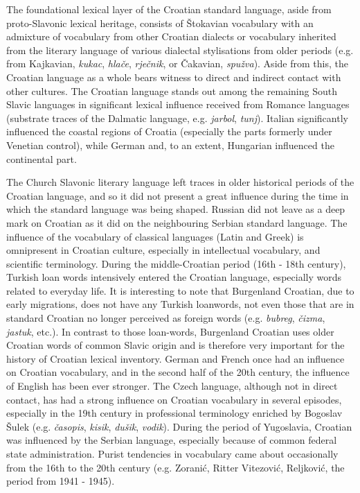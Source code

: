 \begin{multicols}{2}
The foundational lexical layer of the Croatian standard language, aside from proto-Slavonic lexical heritage, consists of Štokavian vocabulary with an admixture of vocabulary from other Croatian dialects or vocabulary inherited from the literary language of various dialectal stylisations from older periods (e.g. from Kajkavian, \emph{kukac}, \emph{hlače}, \emph{rječnik}, or Čakavian, \emph{spužva}). Aside from this, the Croatian language as a whole bears witness to direct and indirect contact with other cultures. The Croatian language stands out among the remaining South Slavic languages in significant lexical influence received from Romance languages (substrate traces of the Dalmatic language, e.g. \emph{jarbol}, \emph{tunj}).  Italian significantly influenced the coastal regions of Croatia (especially the parts formerly under Venetian control), while German and, to an extent, Hungarian influenced the continental part. 

The Church Slavonic literary language left traces in older historical periods of the Croatian language, and so it did not present a great influence during the time in which the standard language was being shaped. Russian did not leave as a deep mark on Croatian as it did on the neighbouring Serbian standard language. The influence of the vocabulary of classical languages (Latin and Greek) is omnipresent in Croatian culture, especially in intellectual vocabulary, and scientific terminology. During the middle-Croatian period (16th - 18th century), Turkish loan words intensively entered the Croatian language, especially words related to everyday life. It is interesting to note that Burgenland Croatian, due to early migrations, does not have any Turkish loanwords, not even those that are in standard Croatian no longer perceived as foreign words (e.g. \emph{bubreg}, \emph{čizma}, \emph{jastuk}, etc.). In contrast to those loan-words, Burgenland Croatian uses older Croatian words of common Slavic origin and is therefore very important for the history of Croatian lexical inventory. German and French once had an influence on Croatian vocabulary, and in the second half of the 20th century, the influence of English has been ever stronger. The Czech language, although not in direct contact, has had a strong influence on Croatian vocabulary in several episodes, especially in the 19th century in professional terminology enriched by Bogoslav Šulek (e.g. \emph{časopis}, \emph{kisik}, \emph{dušik}, \emph{vodik}). During the period of Yugoslavia, Croatian was influenced by the Serbian language, especially because of common federal state administration. Purist tendencies in vocabulary came about occasionally from the 16th to the 20th century (e.g. Zoranić, Ritter Vitezović, Reljković, the period from 1941 - 1945).


\end{multicols}
